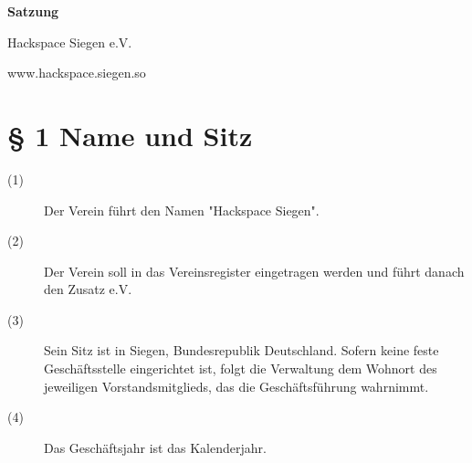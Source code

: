 \documentclass[a4paper,12pt]{scrartcl}
\begin{document}
\begin{titlepage}
\begin{center}
\begin{Huge}

\textbf{Satzung}
\vspace{0.5cm}
\begin{small}
\begin{center}Hackspace Siegen e.V.\end{center}
\end{small}

\end{Huge}
\end{center}

\vfill

\begin{center}
www.hackspace.siegen.so
\end{center}  
\end{titlepage}

\newpage

\tableofcontents
\thispagestyle{empty}
\clearpage



\renewcommand{\sectionmark}[1]{\markright{#1}}
\renewcommand{\subsectionmark}[1]{}
\renewcommand{\subsubsectionmark}[1]{}
\rhead{\today}

\onehalfspacing
\renewcommand{\thesection}{\arabic{section}}
\renewcommand{\thesection}{\arabic{section}}
\setcounter{section}{0}
\setcounter{page}{1}


\section*{\S{} 1 Name und Sitz}
\begin{description} 

\item[(1)] Der Verein führt den Namen "Hackspace Siegen".
\item[(2)] Der Verein soll in das Vereinsregister eingetragen werden und führt danach den Zusatz e.V.
\item[(3)] Sein Sitz ist in Siegen, Bundesrepublik Deutschland. Sofern keine feste Geschäftsstelle eingerichtet ist, folgt die Verwaltung dem Wohnort des jeweiligen Vorstandsmitglieds, das die Geschäftsführung wahrnimmt. 
\item[(4)] Das Geschäftsjahr ist das Kalenderjahr.

\end{description}
\end{document}
